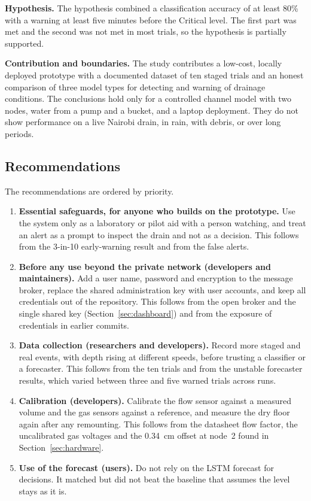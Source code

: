 \documentclass[12pt, a4paper]{article}
\begin{document}
\textbf{Hypothesis.} The hypothesis combined a classification accuracy of at least 80\% with a warning at least five minutes before the Critical level. The first part was met and the second was not met in most trials, so the hypothesis is partially supported.

\textbf{Contribution and boundaries.} The study contributes a low-cost, locally deployed prototype with a documented dataset of ten staged trials and an honest comparison of three model types for detecting and warning of drainage conditions. The conclusions hold only for a controlled channel model with two nodes, water from a pump and a bucket, and a laptop deployment. They do not show performance on a live Nairobi drain, in rain, with debris, or over long periods.

\subsection{Recommendations}

The recommendations are ordered by priority.

\begin{enumerate}
\item \textbf{Essential safeguards, for anyone who builds on the prototype.} Use the system only as a laboratory or pilot aid with a person watching, and treat an alert as a prompt to inspect the drain and not as a decision. This follows from the 3-in-10 early-warning result and from the false alerts.
\item \textbf{Before any use beyond the private network (developers and maintainers).} Add a user name, password and encryption to the message broker, replace the shared administration key with user accounts, and keep all credentials out of the repository. This follows from the open broker and the single shared key (Section~\ref{sec:dashboard}) and from the exposure of credentials in earlier commits.
\item \textbf{Data collection (researchers and developers).} Record more staged and real events, with depth rising at different speeds, before trusting a classifier or a forecaster. This follows from the ten trials and from the unstable forecaster results, which varied between three and five warned trials across runs.
\item \textbf{Calibration (developers).} Calibrate the flow sensor against a measured volume and the gas sensors against a reference, and measure the dry floor again after any remounting. This follows from the datasheet flow factor, the uncalibrated gas voltages and the 0.34~cm offset at node~2 found in Section~\ref{sec:hardware}.
\item \textbf{Use of the forecast (users).} Do not rely on the LSTM forecast for decisions. It matched but did not beat the baseline that assumes the level stays as it is.
\end{enumerate}
\end{document}
